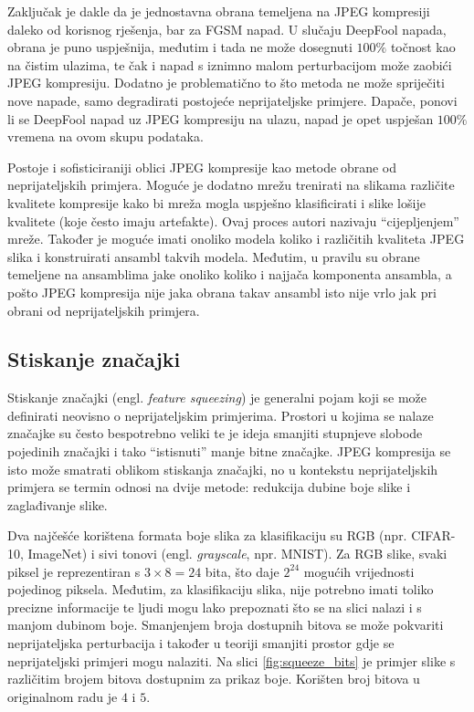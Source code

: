 \documentclass[utf8, diplomski]{fer}
\begin{document}
Zaključak je dakle da je jednostavna obrana temeljena na JPEG kompresiji daleko od korisnog rješenja, bar za FGSM napad. U slučaju DeepFool napada, obrana je puno uspješnija, međutim i tada ne može dosegnuti $100\%$ točnost kao na čistim ulazima, te čak i napad s iznimno malom perturbacijom može zaobići JPEG kompresiju. Dodatno je problematično to što metoda ne može spriječiti nove napade, samo degradirati postojeće neprijateljske primjere. Dapače, ponovi li se DeepFool napad uz JPEG kompresiju na ulazu, napad je opet uspješan $100\%$ vremena na ovom skupu podataka.
\par
Postoje i sofisticiraniji oblici JPEG kompresije kao metode obrane\citep{jpeg2} od neprijateljskih primjera. Moguće je dodatno mrežu trenirati na slikama različite kvalitete kompresije kako bi mreža mogla uspješno klasificirati i slike lošije kvalitete (koje često imaju artefakte). Ovaj proces autori nazivaju ``cijepljenjem'' mreže. Također je moguće imati onoliko modela koliko i različitih kvaliteta JPEG slika i konstruirati ansambl takvih modela. Međutim, u pravilu su obrane temeljene na ansamblima jake onoliko koliko i najjača komponenta ansambla, a pošto JPEG kompresija nije jaka obrana takav ansambl isto nije vrlo jak pri obrani od neprijateljskih primjera.

\subsection{Stiskanje značajki}
Stiskanje značajki\citep{squeezing} (engl. \textit{feature squeezing}) je generalni pojam koji se može definirati neovisno o neprijateljskim primjerima. Prostori u kojima se nalaze značajke su često bespotrebno veliki te je ideja smanjiti stupnjeve slobode pojedinih značajki i tako ``istisnuti'' manje bitne značajke. JPEG kompresija se isto može smatrati oblikom stiskanja značajki, no u kontekstu neprijateljskih primjera se termin odnosi na dvije metode: redukcija dubine boje slike i zaglađivanje slike. \par
Dva najčešće korištena formata boje slika za klasifikaciju su RGB (npr. CIFAR-10, ImageNet) i sivi tonovi (engl. \textit{grayscale}, npr. MNIST). Za RGB slike, svaki piksel je reprezentiran s $3 \times 8 = 24$ bita, što daje $2^{24}$ mogućih vrijednosti pojedinog piksela. Međutim, za klasifikaciju slika, nije potrebno imati toliko precizne informacije te ljudi mogu lako prepoznati što se na slici nalazi i s manjom dubinom boje. Smanjenjem broja dostupnih bitova se može pokvariti neprijateljska perturbacija i također u teoriji smanjiti prostor gdje se neprijateljski primjeri mogu nalaziti. Na slici \ref{fig:squeeze_bits} je primjer slike s različitim brojem bitova dostupnim za prikaz boje. Korišten broj bitova u originalnom radu je $4$ i $5$.
\end{document}
